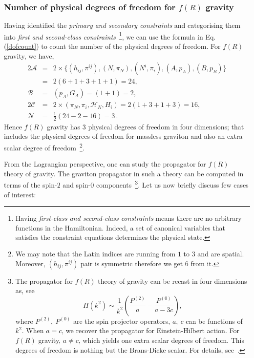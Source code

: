 \documentclass[a4paper,12pt]{article}
\newcommand{\+}{^{\dagger}}
\newcommand{\2}{\frac{1}{2}}
\newcommand{\3}{\frac{1}{3}}
\newcommand{\4}{\frac{1}{4}}
\newcommand{\6}{\frac{1}{6}}
\newcommand{\8}{\frac{1}{8}}
\begin{document}

\subsubsection{Number of physical degrees of freedom for $f(R)$ gravity}

Having identified the {\it primary and secondary constraints} and categorising them into {\it first and second-class constraints}~\footnote{Having {\it first-class and second-class constraints} means there are no arbitrary functions in the Hamiltonian. Indeed, a set of canonical variables that satisfies the constraint equations determines the physical state. }, we can use the formula in Eq. (\ref{dofcount}) to count the number of the physical degrees of freedom. For $f(R)$ gravity, 
we have, 
\begin{eqnarray}
2\mathcal{A}&=&2\times\{(h_{ij}, \pi^{ij}),(N,\pi_N),(N^i, \pi_i),(A,p_A),(B,p_B)\}\nonumber\\
~&=& 2(6+1+3+1+1)=24,\nonumber\\
\mathcal{B}&=&(p_{A},G_{A})=(1+1)=2,\nonumber\\
2\mathcal{C}&=&2\times(\pi_N,\pi_i,\mathcal{H}_N,H_{i})=2(1+3+1+3)=16,\nonumber\\
\mathcal{N}&=&\frac{1}{2}(24-2-16)=3\,.
\end{eqnarray}
Hence $f(R)$ gravity has $3$ physical degrees of freedom in four dimensions; that includes the physical degrees of freedom for massless graviton and also an extra scalar degree of freedom~\footnote{We may note that the Latin indices are running from $1$ to $3$ and are spatial. Moreover, $(h_{ij}, \pi^{ij})$ pair is symmetric therefore we get $6$ from it.}.

From the Lagrangian perspective, one can study the propagator for $f(R)$ theory of gravity. The graviton propagator in such a theory can be 
computed in terms of the spin-$2$ and spin-$0$ components~\footnote{\label{oo}The propagator for $f(R)$ theory of gravity can be recast in four dimensions as, see~\cite{Biswas:2013kla}
$$\Pi(k^2) \sim \frac{1}{k^2}\left(\frac{P^{(2)}}{a}-\frac{P^{(0)}}{a-3c}\right),$$
where $P^{(2)},~P^{(0)}$ are the spin projector operators,
$a,~c$ can be functions of $k^2$. When $a=c$, we recover the propagator for Einstein-Hilbert action. For $f(R)$ gravity, $a\neq c$, which yields one extra scalar degrees of freedom. This degrees of freedom is nothing but the Brans-Dicke scalar. For details, see~\cite{Biswas:2013kla}.}.
Let us now briefly discuss few cases of interest:
\end{document}
